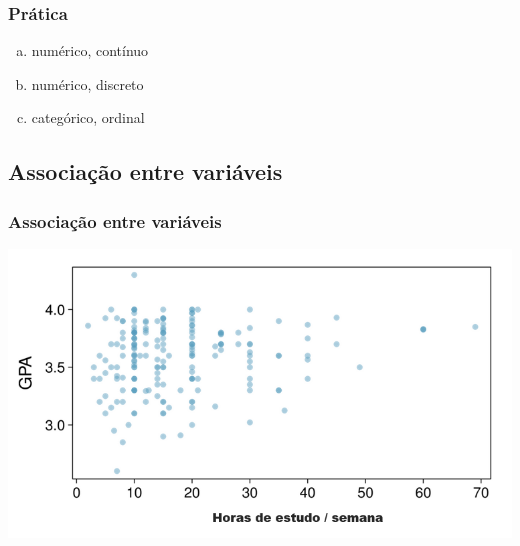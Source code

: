 
\begin{frame}
\frametitle{Prática}


\begin{enumerate}[(a)]
\item numérico, contínuo
\item numérico, discreto
\item categórico, ordinal
\end{enumerate}

\end{frame}


\subsection{Associação entre variáveis}







\begin{frame}
\frametitle{Associação entre variáveis}


\begin{center}
\cfill \includegraphics[scale=0.5]{1-2_data_basics/gpa_study_hours.png}
\end{center}

\end{frame}


